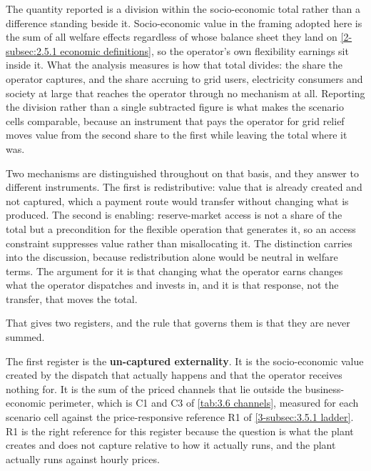 The quantity reported is a division within the socio-economic total rather than a difference standing beside it. Socio-economic value in the framing adopted here is the sum of all welfare effects regardless of whose balance sheet they land on \autoref{2-subsec:2.5.1 economic definitions}, so the operator's own flexibility earnings sit inside it. What the analysis measures is how that total divides: the share the operator captures, and the share accruing to grid users, electricity consumers and society at large that reaches the operator through no mechanism at all. Reporting the division rather than a single subtracted figure is what makes the scenario cells comparable, because an instrument that pays the operator for grid relief moves value from the second share to the first while leaving the total where it was.

Two mechanisms are distinguished throughout on that basis, and they answer to different instruments. The first is redistributive: value that is already created and not captured, which a payment route would transfer without changing what is produced. The second is enabling: reserve-market access is not a share of the total but a precondition for the flexible operation that generates it, so an access constraint suppresses value rather than misallocating it. The distinction carries into the discussion, because redistribution alone would be neutral in welfare terms. The argument for it is that changing what the operator earns changes what the operator dispatches and invests in, and it is that response, not the transfer, that moves the total.

That gives two registers, and the rule that governs them is that they are never summed.

The first register is the \textbf{un-captured externality}. It is the socio-economic value created by the dispatch that actually happens and that the operator receives nothing for. It is the sum of the priced channels that lie outside the business-economic perimeter, which is C1 and C3 of \autoref{tab:3.6 channels}, measured for each scenario cell against the price-responsive reference R1 of \autoref{3-subsec:3.5.1 ladder}. R1 is the right reference for this register because the question is what the plant creates and does not capture relative to how it actually runs, and the plant actually runs against hourly prices.


